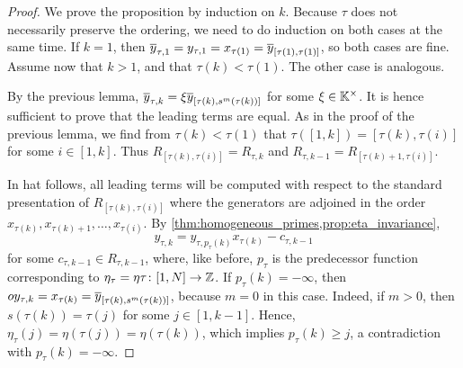 \begin{proof}
	We prove the proposition by induction on $k$. Because $\tau$ does not necessarily preserve the ordering, we need to do induction on both cases at the same time. If $k=1$, then $\overline{y}_{\tau, 1} = y_{\tau, 1} = x_{\tau(1)} = \overline{y}_{[\tau(1), \tau(1)]}$, so both cases are fine. Assume now that $k > 1$, and that $\tau(k) < \tau(1)$. The other case is analogous.

	By the previous lemma, $\overline{y}_{\tau, k} = \xi \overline{y}_{[\tau(k), s^m(\tau(k))]}$ for some
	$\xi \in \mathbb{K}^\times$. It is hence sufficient to prove that the leading terms are
	equal. As in the proof of the previous lemma, we find from $\tau(k) < \tau(1)$ that
	$\tau([1, k]) = [\tau(k), \tau(i)]$ for some $i \in [1, k]$. Thus $R_{[\tau(k),
						\tau(i)]} = R_{\tau, k}$ and $R_{\tau, k-1} = R_{[\tau(k) + 1, \tau(i)]}$.

	In hat follows, all leading terms will be computed with respect to the standard
	presentation of $R_{[\tau(k), \tau(i)]}$ where the generators are adjoined in the order
	$x_{\tau(k)}, x_{\tau(k) + 1}, \dots, x_{\tau(i)}$. By
	\cref{thm:homogeneous_primes,prop:eta_invariance},
	\begin{equation*}
		y_{\tau, k} = y_{\tau, p_{\tau}(k)}x_{\tau(k)} - c_{\tau, k-1}
	\end{equation*}
	for some $c_{\tau, k-1} \in R_{\tau, k-1}$, where, like before, $p_\tau$ is the
	predecessor function corresponding to $\eta_\tau = \eta \tau \colon [1, N] \to \mathbb{Z}$.
	If $p_\tau(k) = -\infty$, then $oy_{\tau, k} = x_{\tau(k)} = \overline{y}_{[\tau(k),
					s^m(\tau(k))]}$, because $m = 0$ in this case. Indeed, if $m>0$, then $s(\tau(k)) =
		\tau(j)$ for some $j \in [1, k-1]$. Hence, $\eta_\tau(j) = \eta(\tau(j)) =
		\eta(\tau(k))$, which implies $p_\tau(k) \geq j$, a contradiction with $p_\tau(k) =
		-\infty$.


\end{proof}
